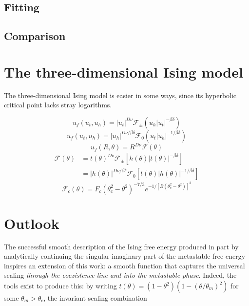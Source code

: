 \documentclass[
  aps,
  pre,
  reprint,
  longbibliography,
  floatfix
]{revtex4-2}
\begin{document}
\subsection{Fitting}

\subsection{Comparison}

\section{The three-dimensional Ising model}

\cite{Butera_2011_Free}

The three-dimensional Ising model is easier in some ways, since its hyperbolic critical point lacks stray logarithms.

\begin{equation} \label{eq:free.energy.3d.low}
  u_f(u_t, u_h)
  = |u_t|^{D\nu}\mathcal F_{\pm}(u_h|u_t|^{-\beta\delta})
\end{equation}
\begin{equation} \label{eq:free.energy.3d.mid}
  u_f(u_t, u_h)
  = |u_h|^{D\nu/\beta\delta}\mathcal F_0(u_t|u_h|^{-1/\beta\delta})
\end{equation}
\begin{equation} \label{eq:schofield.3d.free.energy}
  u_f(R, \theta) = R^{D\nu}\mathcal F(\theta)
\end{equation}
\begin{equation} \label{eq:scaling.function.equivalences.3d}
  \begin{aligned}
    \mathcal F(\theta)
    &=t(\theta)^{D\nu}\mathcal F_\pm\left[h(\theta)|t(\theta)|^{-\beta\delta}\right] \\
    &=|h(\theta)|^{D\nu/\beta\delta}\mathcal F_0\left[t(\theta)|h(\theta)|^{-1/\beta\delta}\right]
  \end{aligned}
\end{equation}
\begin{equation}
  \mathcal F_c(\theta)=F_c(\theta_c^2-\theta^2)^{-7/3}e^{-1/[B(\theta_c^2-\theta^2)]^2}
\end{equation}

\section{Outlook}

The successful smooth description of the Ising free energy produced in part by analytically continuing the singular imaginary part of the metastable free energy inspires an extension of this work: a smooth function that captures the universal scaling \emph{through the coexistence line and into the metastable phase}. Indeed, the tools exist to produce this: by writing $t(\theta)=(1-\theta^2)(1-(\theta/\theta_m)^2)$ for some $\theta_m>\theta_c$, the invariant scaling combination
\end{document}
